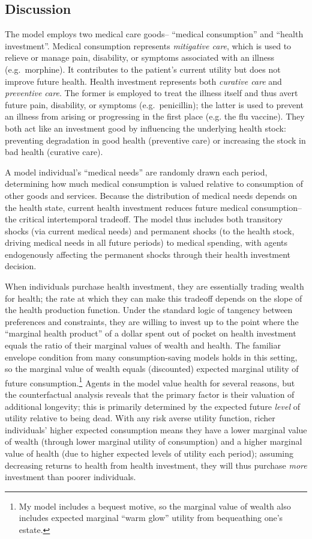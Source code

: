 \documentclass[12pt,pdftex,letterpaper]{article}
\begin{document}
\subsection{Discussion}
\label{sec:Disc}

The model employs two medical care goods-- ``medical consumption'' and ``health investment''.  Medical consumption represents \textit{mitigative care}, which is used to relieve or manage pain, disability, or symptoms associated with an illness (e.g.\ morphine). It contributes to the patient's current utility but does not improve future health.  Health investment represents both \textit{curative care} and \textit{preventive care}. The former is employed to treat the illness itself and thus avert future pain, disability, or symptoms (e.g.\ penicillin); the latter is used to prevent an illness from arising or progressing in the first place (e.g. the flu vaccine).  They both act like an investment good by influencing the underlying health stock: preventing degradation in good health (preventive care) or increasing the stock in bad health (curative care).

A model individual's ``medical needs'' are randomly drawn each period, determining how much medical consumption is valued relative to consumption of other goods and services.  Because the distribution of medical needs depends on the health state, current health investment reduces future medical consumption-- the critical intertemporal tradeoff.  The model thus includes both transitory shocks (via current medical needs) and permanent shocks (to the health stock, driving medical needs in all future periods) to medical spending, with agents endogenously affecting the permanent shocks through their health investment decision.

When individuals purchase health investment, they are essentially trading wealth for health; the rate at which they can make this tradeoff depends on the slope of the health production function.  Under the standard logic of tangency between preferences and constraints, they are willing to invest up to the point where the ``marginal health product'' of a dollar spent out of pocket on health investment equals the ratio of their marginal values of wealth and health.  The familiar envelope condition from many consumption-saving models holds in this setting, so the marginal value of wealth equals (discounted) expected marginal utility of future consumption.\footnote{My model includes a bequest motive, so the marginal value of wealth also includes expected marginal ``warm glow'' utility from bequeathing one's estate.}  Agents in the model value health for several reasons, but the counterfactual analysis reveals that the primary factor is their valuation of additional longevity; this is primarily determined by the expected future \textit{level} of utility relative to being dead.  With any risk averse utility function, richer individuals' higher expected consumption means they have a lower marginal value of wealth (through lower marginal utility of consumption) and a higher marginal value of health (due to higher expected levels of utility each period); assuming decreasing returns to health from health investment, they will thus purchase \textit{more} investment than poorer individuals.
\end{document}
